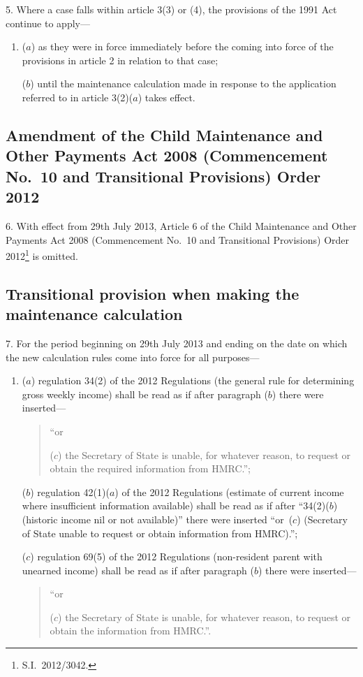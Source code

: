 \documentclass[12pt,a4paper]{article}
\begin{document}
5.  Where a case falls within article 3(3) or (4), the provisions of the 1991 Act continue to apply—
\begin{enumerate}\item[]
($a$) as they were in force immediately before the coming into force of the provisions in article 2 in relation to that case;

($b$) until the maintenance calculation made in response to the application referred to in article 3(2)($a$)  takes effect.
\end{enumerate}

\subsection[6. Amendment of the Child Maintenance and Other Payments Act 2008 (Commencement No.~10 and Transitional Provisions) Order 2012]{Amendment of the Child Maintenance and Other Payments Act 2008 (Commencement No.~10 and Transitional Provisions) Order 2012}

6.  With effect from 29th July 2013, Article 6 of the Child Maintenance and Other Payments Act 2008 (Commencement No.~10 and Transitional Provisions) Order 2012\footnote{S.I.~2012/3042.} is omitted.

\subsection[7. Transitional provision when making the maintenance calculation]{Transitional provision when making the maintenance calculation}

7.  For the period beginning on 29th July 2013 and ending on the date on which the new calculation rules come into force for all purposes—
\begin{enumerate}\item[]
($a$) regulation 34(2) of the 2012 Regulations (the general rule for determining gross weekly income) shall be read as if after paragraph ($b$)  there were inserted—
\begin{quotation}
“or

($c$) the Secretary of State is unable, for whatever reason, to request or obtain the required information from HMRC.”;
\end{quotation}

($b$) regulation 42(1)($a$)  of the 2012 Regulations (estimate of current income where insufficient information available) shall be read as if after “34(2)($b$)  (historic income nil or not available)” there were inserted “or~($c$)  (Secretary of State unable to request or obtain information from HMRC).”;

($c$) regulation 69(5) of the 2012 Regulations (non-resident parent with unearned income) shall be read as if after paragraph ($b$)  there were inserted—
\begin{quotation}
“or

($c$) the Secretary of State is unable, for whatever reason, to request or obtain the information from HMRC.”.
\end{quotation}
\end{enumerate}
\end{document}
